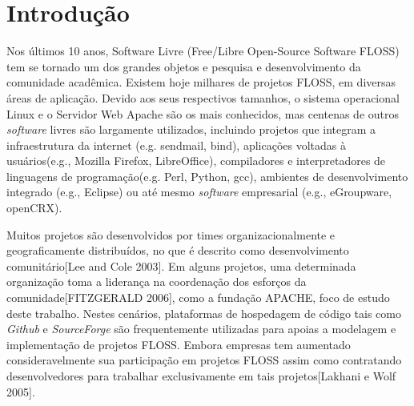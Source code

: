 \chapter{Introdução}
\label{chapter:intro}


Nos últimos 10 anos, Software Livre (Free/Libre Open-Source    Software FLOSS) tem se tornado um dos grandes objetos e pesquisa e desenvolvimento da comunidade acadêmica. Existem hoje milhares de projetos FLOSS, em diversas áreas de aplicação. Devido aos seus respectivos tamanhos, o sistema operacional Linux e o Servidor Web Apache são os mais conhecidos, mas centenas de outros \textit{software} livres são largamente utilizados, incluindo projetos que integram a infraestrutura da internet (e.g. sendmail, bind), aplicações voltadas à usuários(e.g., Mozilla Firefox, LibreOffice), compiladores e interpretadores de linguagens de programação(e.g. Perl, Python, gcc), ambientes de desenvolvimento integrado (e.g., Eclipse) ou até mesmo \textit{software} empresarial (e.g., eGroupware, openCRX).



Muitos projetos são desenvolvidos por times organizacionalmente e geograficamente distribuídos, no que é descrito como desenvolvimento comunitário[Lee and Cole 2003]. Em alguns projetos, uma determinada organização toma a liderança na coordenação dos esforços da comunidade[FITZGERALD 2006], como a fundação APACHE, foco de estudo deste trabalho. Nestes cenários, plataformas de hospedagem de código tais como \textit{Github} e \textit{SourceForge} são frequentemente utilizadas para apoias a modelagem e implementação de projetos FLOSS. Embora empresas tem aumentado consideravelmente sua participação em projetos FLOSS assim como contratando  desenvolvedores para trabalhar exclusivamente em tais projetos[Lakhani e Wolf 2005].


